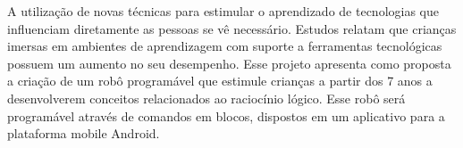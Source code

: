 \begin{resumo}
  A utilização de novas técnicas para estimular o aprendizado de tecnologias que influenciam diretamente as pessoas se vê necessário.  Estudos relatam que crianças imersas em ambientes de aprendizagem com suporte a ferramentas tecnológicas possuem um aumento no seu desempenho. Esse projeto apresenta como proposta a criação de um robô programável que estimule crianças a partir dos 7 anos a desenvolverem conceitos relacionados ao raciocínio lógico. Esse robô será programável através de comandos em blocos, dispostos em um aplicativo para a plataforma mobile Android.  
\end{resumo}

